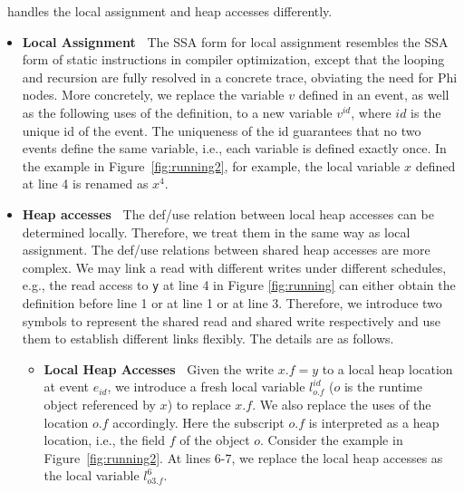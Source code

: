 \tool\ handles the local assignment and heap accesses differently.
\begin{itemize}
\item {\bf Local Assignment\ } The SSA form for local assignment resembles the SSA form of static instructions in compiler optimization, except that the looping and recursion are fully resolved in a concrete trace, obviating the need for {\sf Phi} nodes. More concretely, we replace the variable $v$ defined in an event, as well as the following uses of the definition, to a new variable $v^{id}$, where $id$ is the unique id of the event. The uniqueness of the id guarantees that no two events define the same variable, i.e., each variable is defined exactly once.  In the example in Figure~\ref{fig:running2}, for example,
the local variable $x$ defined at line 4 is renamed as $x^4$.
\item {\bf Heap accesses\ } The def/use relation between local heap accesses can be determined locally. Therefore, we treat them in the same way as local assignment. The def/use relations between shared heap accesses are more complex. We may link a read with different writes under different schedules, e.g., the read access to {\tt y} at line 4 in Figure \ref{fig:running} can either obtain the definition before line 1 or at line 1 or at line 3. Therefore, we introduce two symbols to represent the shared read and shared write respectively and use them to establish different links flexibly. The details are as follows. 
\begin{itemize}
\item {\bf Local Heap Accesses\ } Given the write $x.f=y$ to a local heap location at event $e_{id}$,  we introduce a fresh local variable {\tt $l^{id}_{o.f}$} ($o$ is the runtime object referenced by $x$) to replace $x.f$. We also replace the uses of the location $o.f$ accordingly.
Here  the subscript $o.f$ is interpreted as a heap location, i.e., the field $f$ of the object $o$. Consider the example in Figure~\ref{fig:running2}. At lines 6-7, we replace the local heap accesses as the local variable $l^6_{o3.f}$.

\end{itemize}
\end{itemize}
